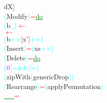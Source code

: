 {\rm{}dX}\textcolor{red}{]}\\\hsspace \textcolor{cyan}{(}{\rm{}Modify}\textcolor{cyan}{)}\hsspace \textcolor{red}{=}\hsspace \textcolor{green}{\underline{do}}\\\hstab \hstab \textcolor{cyan}{(}{\rm{}b}\textcolor{cyan}{,}\textcolor{cyan}{,}\textcolor{cyan}{)}\hsspace \textcolor{red}{\ensuremath{\leftarrow}}\\\hstab {}\hsspace \textcolor{red}{\ensuremath{\leftarrow}}\\\hstab {}\hsspace \textcolor{cyan}{(}{\rm{}b}\hsspace \textcolor{cyan}{++}\hsspace \textcolor{red}{[}{\rm{}x'}\textcolor{red}{]}\hsspace \textcolor{cyan}{++}\textcolor{cyan}{)}\\\hsspace \textcolor{cyan}{(}{\rm{}Insert}\textcolor{cyan}{)}\hsspace \textcolor{red}{=}\hsspace \textcolor{cyan}{(}{\rm{}xs}\hsspace \textcolor{cyan}{++}\textcolor{cyan}{)}\\\hsspace \textcolor{cyan}{(}{\rm{}Delete}\textcolor{cyan}{)}\hsspace \textcolor{red}{=}\hsspace \textcolor{green}{\underline{do}}\\\hstab {}\hsspace \textcolor{cyan}{(}\textcolor{magenta}{0}\hsspace \textcolor{cyan}{\ensuremath{\langle}=}\hsspace \textcolor{cyan}{\&\&}\hsspace \textcolor{cyan}{\ensuremath{\langle}=}\textcolor{cyan}{)}\\\hstab {}\hsspace \textcolor{cyan}{(}{\rm{}zipWith}\hsspace \textcolor{cyan}{(}{\rm{}genericDrop}\textcolor{cyan}{)}\textcolor{cyan}{)}\\\hsspace \textcolor{cyan}{(}{\rm{}Rearrange}\textcolor{cyan}{)}\hsspace \textcolor{red}{=}\hsspace \textcolor{cyan}{(}{\rm{}applyPermutation}\textcolor{cyan}{)}\\\hsspace \textcolor{green}{\underline{\_}}\hsspace \textcolor{green}{\underline{\_}}\hsspace \textcolor{red}{=}\\
